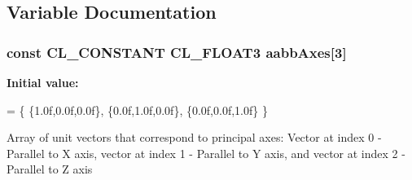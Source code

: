 \subsection{Variable Documentation}
\subsubsection[{\texorpdfstring{aabb\+Axes}{aabbAxes}}]{\setlength{\rightskip}{0pt plus 5cm}const C\+L\+\_\+\+C\+O\+N\+S\+T\+A\+NT C\+L\+\_\+\+F\+L\+O\+A\+T3 aabb\+Axes\mbox{[}3\mbox{]}}\hypertarget{group__g11_gadb5234dc4adddee61354eb8d193da854}{}\label{group__g11_gadb5234dc4adddee61354eb8d193da854}
{\bfseries Initial value\+:}
\begin{DoxyCode}
= \{ 
                                \{1.0f,0.0f,0.0f\},
                                \{0.0f,1.0f,0.0f\},
                                \{0.0f,0.0f,1.0f\} 
                              \}
\end{DoxyCode}
Array of unit vectors that correspond to principal axes\+: Vector at index 0 -\/ Parallel to X axis, vector at index 1 -\/ Parallel to Y axis, and vector at index 2 -\/ Parallel to Z axis 